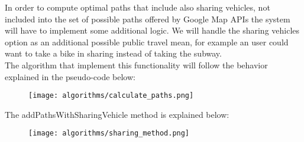 In order to compute optimal paths that include also sharing vehicles, not included into the set of possible paths offered by Google Map APIs the system will have to implement some additional logic. We will handle the sharing vehicles option as an additional possible public travel mean, for example an user could want to take a bike in sharing instead of taking the subway.\\
The algorithm that implement this functionality will follow the behavior explained in the pseudo-code below:
\begin{figure}[H]
\begin{center}
		\texttt{[image: algorithms/calculate\_paths.png]}
\end{center}
\end{figure}
The addPathsWithSharingVehicle method is explained below:
\begin{figure}[H]
\begin{center}
		\texttt{[image: algorithms/sharing\_method.png]}
		
\end{center}
\end{figure}

